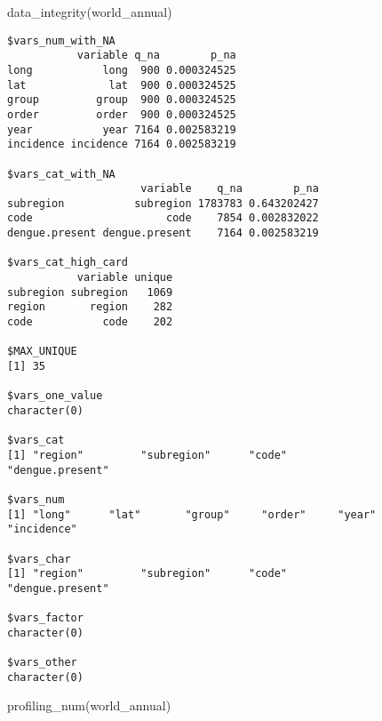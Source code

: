 \documentclass[
  letterpaper,
  DIV=11,
  numbers=noendperiod]{scrreprt}
\newenvironment{Shaded}{\begin{snugshade}}{\end{snugshade}}
\newcommand{\FunctionTok}[1]{\textcolor[rgb]{0.28,0.35,0.67}{#1}}
\newcommand{\NormalTok}[1]{\textcolor[rgb]{0.00,0.23,0.31}{#1}}
\begin{document}
\begin{Shaded}
\begin{Highlighting}[]
\FunctionTok{data\_integrity}\NormalTok{(world\_annual)}
\end{Highlighting}
\end{Shaded}

\begin{verbatim}
$vars_num_with_NA
           variable q_na        p_na
long           long  900 0.000324525
lat             lat  900 0.000324525
group         group  900 0.000324525
order         order  900 0.000324525
year           year 7164 0.002583219
incidence incidence 7164 0.002583219

$vars_cat_with_NA
                     variable    q_na        p_na
subregion           subregion 1783783 0.643202427
code                     code    7854 0.002832022
dengue.present dengue.present    7164 0.002583219

$vars_cat_high_card
           variable unique
subregion subregion   1069
region       region    282
code           code    202

$MAX_UNIQUE
[1] 35

$vars_one_value
character(0)

$vars_cat
[1] "region"         "subregion"      "code"           "dengue.present"

$vars_num
[1] "long"      "lat"       "group"     "order"     "year"      "incidence"

$vars_char
[1] "region"         "subregion"      "code"           "dengue.present"

$vars_factor
character(0)

$vars_other
character(0)
\end{verbatim}

\begin{Shaded}
\begin{Highlighting}[]
\FunctionTok{profiling\_num}\NormalTok{(world\_annual)}
\end{Highlighting}
\end{Shaded}
\end{document}
